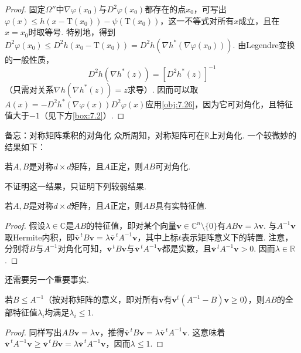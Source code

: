 \begin{proof}
固定$\Omega''$中$\nabla\varphi(x_0)$与$D^2\varphi(x_0)$都存在的点$x_0$，可写出$\varphi(x)\leq h(x-\mathrm T(x_0))-\psi(\mathrm T(x_0))$，这一不等式对所有$x$成立，且在$x=x_0$时取等号. 特别地，得到$D^2\varphi(x_0)\leq D^2h(x_0-\mathrm T(x_0))=D^2h(\nabla h^*(\nabla\varphi(x_0)))$. 由Legendre变换的一般性质，
\[
 D^2h(\nabla h^*(z))=[D^2h^*(z)]^{-1}
\]
（只需对关系$\nabla h(\nabla h^*(z))=z$求导）. 因而可以取$A(x)=-D^2h^*(\nabla\varphi(x))D^2\varphi(x)$应用\autoref{obj:7.26}，因为它可对角化，且特征值大于$-1$（见下方\autoref{box:7.2}）.
\end{proof}

\begin{sourcebox}{备忘：对称矩阵乘积的对角化}\label{box:7.2}
众所周知，对称矩阵可在$\mathbb R$上对角化. 一个较微妙的结果如下：
\begin{theorem*}
若$A,B$是对称$d\times d$矩阵，且$A$正定，则$AB$可对角化.
\end{theorem*}
不证明这一结果，只证明下列较弱结果.
\begin{proposition*}
若$A,B$是对称$d\times d$矩阵，且$A$正定，则$AB$具有实特征值.
\end{proposition*}
\begin{proof}
假设$\lambda\in\mathbb C$是$AB$的特征值，即对某个向量$\mathbf v\in\mathbb C^n\setminus\{0\}$有$AB\mathbf v=\lambda\mathbf v$. 与$A^{-1}\mathbf v$取Hermite内积，即$\overline{\mathbf v}^{\,t}B\mathbf v=\lambda\overline{\mathbf v}^{\,t}A^{-1}\mathbf v$，其中上标$t$表示矩阵意义下的转置. 注意，分别将$B$与$A^{-1}$对角化可知，$\overline{\mathbf v}^{\,t}B\mathbf v$与$\overline{\mathbf v}^{\,t}A^{-1}\mathbf v$都是实数，且$\overline{\mathbf v}^{\,t}A^{-1}\mathbf v>0$. 因而$\lambda\in\mathbb R$.
\end{proof}
还需要另一个重要事实.
\begin{proposition*}
若$B\leq A^{-1}$（按对称矩阵的意义，即对所有$\mathbf v$有$\mathbf v^t(A^{-1}-B)\mathbf v\geq0$），则$AB$的全部特征值$\lambda_i$均满足$\lambda_i\leq1$.
\end{proposition*}
\begin{proof}
同样写出$AB\mathbf v=\lambda\mathbf v$，推得$\overline{\mathbf v}^{\,t}B\mathbf v=\lambda\overline{\mathbf v}^{\,t}A^{-1}\mathbf v$. 这意味着$\overline{\mathbf v}^{\,t}A^{-1}\mathbf v\geq\overline{\mathbf v}^{\,t}B\mathbf v=\lambda\overline{\mathbf v}^{\,t}A^{-1}\mathbf v$，因而$\lambda\leq1$.
\end{proof}
\end{sourcebox}

